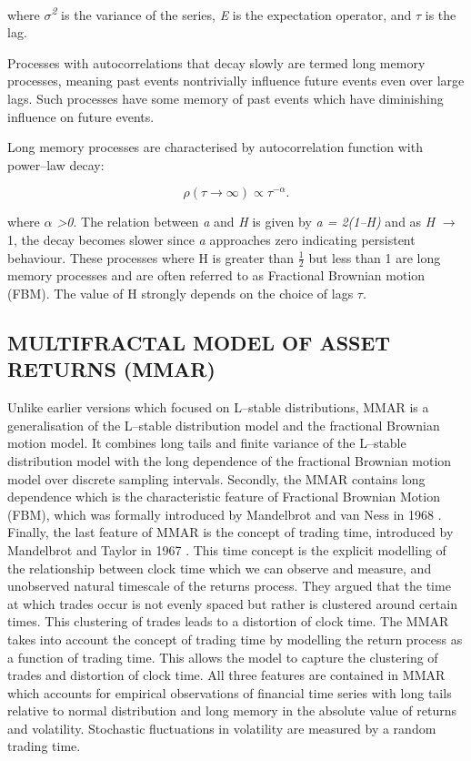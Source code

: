 \documentclass[12pt,a4paper]{report}
\numberwithin{equation}{section}
\begin{document}
where \emph{$\sigma$\textsuperscript{2}} is the variance of the series,
\emph{E} is the expectation operator, and $\tau$ is the lag.

Processes with autocorrelations that decay slowly are termed long memory
processes, meaning past events nontrivially influence future events even
over large lags. Such processes have some memory of past events which
have diminishing influence on future events.

Long memory processes are characterised by autocorrelation function with
power--law decay:

\begin{equation}
\rho(\tau \to \infty) \propto \tau^{-\alpha}.
\label{eq:rho-power-law}
\end{equation}


where \emph{$\alpha$ \textgreater0}. The relation between \emph{a} and \emph{H}
is given by \emph{a = 2(1--H)} and as \emph{H} $\rightarrow$ 1, the decay becomes
slower since \emph{a} approaches zero indicating persistent behaviour.
These processes where H is greater than $\frac{1}{2}$ but less than 1 are long
memory processes and are often referred to as Fractional Brownian motion
(FBM). The value of H strongly depends on the choice of lags $\tau$.

\hypertarget{multifractal--model--of--asset--returns--mmar}{%
\subsection{MULTIFRACTAL MODEL OF ASSET RETURNS
(MMAR)}\label{multifractal--model--of--asset--returns--mmar}}

Unlike earlier versions which focused on L--stable distributions, MMAR is
a generalisation of the L--stable distribution model and the fractional
Brownian motion model. It combines long tails and finite variance of the
L--stable distribution model with the long dependence of the fractional
Brownian motion model over discrete sampling intervals. Secondly, the
MMAR contains long dependence which is the characteristic feature of
Fractional Brownian Motion (FBM), which was formally introduced by
Mandelbrot and van Ness in 1968 \cite{ness1968fractional_4}. Finally, the last feature of
MMAR is the concept of trading time, introduced by Mandelbrot and Taylor
in 1967 \cite{taylor1967distribution_20}. This time concept is the explicit modelling of the
relationship between clock time which we can observe and measure, and
unobserved natural timescale of the returns process. They argued that
the time at which trades occur is not evenly spaced but rather is
clustered around certain times. This clustering of trades leads to a
distortion of clock time. The MMAR takes into account the concept of
trading time by modelling the return process as a function of trading
time. This allows the model to capture the clustering of trades and
distortion of clock time. All three features are contained in MMAR which
accounts for empirical observations of financial time series with long
tails relative to normal distribution and long memory in the absolute
value of returns and volatility. Stochastic fluctuations in volatility
are measured by a random trading time.
\end{document}
